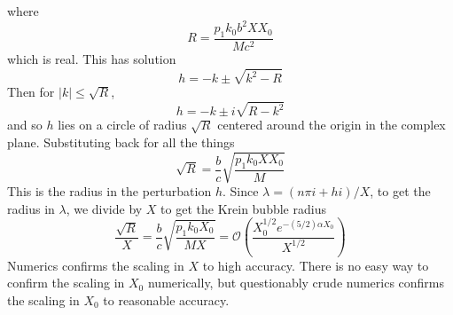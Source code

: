 \documentclass[thesis.tex]{subfiles}
\begin{document}
where 
\[
R = \frac{p_1 k_0 b^2 X X_0 }{M c^2}
\]
which is real. This has solution
\[
h = -k \pm \sqrt{k^2 - R}
\]
Then for $|k| \leq \sqrt{R}$,
\[
h = -k \pm i \sqrt{R - k^2}
\]
and so $h$ lies on a circle of radius $\sqrt{R}$ centered around the origin in the complex plane. Substituting back for all the things
\[
\sqrt{R} = \frac{b}{c} \sqrt{\frac{p_1 k_0 X X_0 }{M} }
\]
This is the radius in the perturbation $h$. Since $\lambda = (n \pi i + h i)/X$, to get the radius in $\lambda$, we divide by $X$ to get the Krein bubble radius
\[
\frac{\sqrt{R}}{X} = \frac{b}{c} \sqrt{\frac{p_1 k_0 X_0 }{M X} } = \mathcal{O}\left(\frac{ X_0^{1/2} e^{-(5/2) \alpha X_0} }{X^{1/2}} \right)
\] 
Numerics confirms the scaling in $X$ to high accuracy. There is no easy way to confirm the scaling in $X_0$ numerically, but questionably crude numerics confirms the scaling in $X_0$ to reasonable accuracy.

\iffulldocument\else
	
	
\fi
\end{document}
